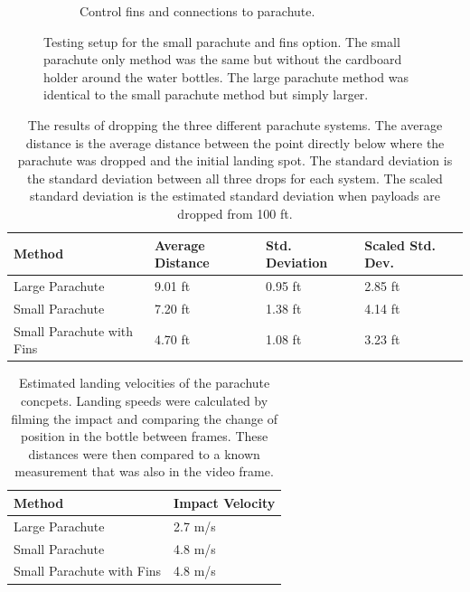\documentclass[]{auvsi_doc}
\begin{document}
\begin{figure}[ht]
\begin{subfigure}{0.49\linewidth}
     \caption{Control fins and connections to parachute.}\label{fig:ControlFins}
   \end{subfigure}
\caption{Testing setup for the small parachute and fins option. The small parachute only method was the same but without the cardboard holder around the water bottles. The large parachute method was identical to the small parachute method but simply larger.}
\label{fig:combined}
\end{figure}

\begin{table}[h!]
\caption{The results of dropping the three different parachute systems. The average distance is the average distance between the point directly below where the parachute was dropped and the initial landing spot. The standard deviation is the standard deviation between all three drops for each system. The scaled standard deviation is the estimated standard deviation when payloads are dropped from 100 ft. }
\label{table:results}

\begin{tabular}{| l | l | l | l |}
\hline
Method & Average Distance & Std. Deviation & Scaled Std. Dev.\\
\hline
Large Parachute & 9.01 ft  & 0.95 ft & 2.85 ft\\
Small Parachute & 7.20 ft  & 1.38 ft & 4.14 ft\\
Small Parachute with Fins & 4.70 ft & 1.08 ft & 3.23 ft\\
\hline

\end{tabular}

\end{table}

\begin{table}[h!]
\caption{Estimated landing velocities of the parachute concpets. Landing speeds were calculated by filming the impact and comparing the change of position in the bottle between frames. These distances were then compared to a known measurement that was also in the video frame.}
\label{table:results_v}

\begin{tabular}{| l | l |}
\hline
Method & Impact Velocity\\
\hline
Large Parachute & 2.7 m/s \\
Small Parachute & 4.8 m/s \\
Small Parachute with Fins & 4.8 m/s \\
\hline

\end{tabular}

\end{table}
\end{document}
